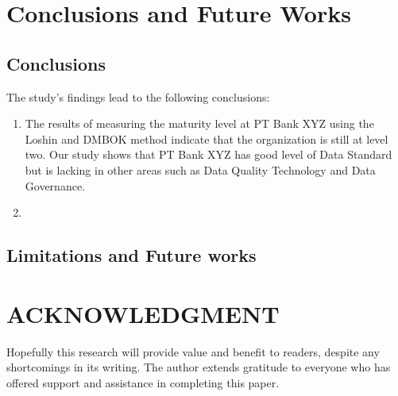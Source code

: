 \documentclass[conference]{IEEEtran}
\begin{document}
\section{Conclusions and Future Works}

\subsection{Conclusions}

The study's findings lead to the following conclusions:

\begin{enumerate}
    \item The results of measuring the maturity level at PT Bank XYZ using the Loshin and DMBOK method \cite{loshin_dqi}\cite{DAMA_2013} indicate that the organization is still at level two. Our study shows that PT Bank XYZ has good level of Data Standard but is lacking in other areas such as Data Quality Technology and Data Governance.
    
    \item \lipsum[1] 
\end{enumerate}


\subsection{Limitations and Future works}

\lipsum[1] 

\section*{ACKNOWLEDGMENT}


Hopefully this research will provide value and benefit to readers, despite any shortcomings in its writing. The author extends gratitude to everyone who has offered support and assistance in completing this paper.



\end{document}
